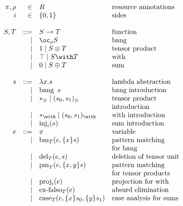 \documentclass[sigplan,review]{acmart}\settopmatter{printfolios=true,printccs=false,printacmref=false}
\newcommand{\fun}[2]{#1 \multimap #2}
\newcommand{\lam}[2]{\lambda #1. #2}
\newcommand{\excl}[2]{\oc_{#1} #2}
\newcommand{\bang}[1]{\operatorname{bang}\ #1}
\newcommand{\bm}[3]{\operatorname{bm}_{#1}(#2, #3)}
\newcommand{\tensorOne}[0]{1}
\newcommand{\unit}[0]{{*}_\otimes}
\newcommand{\del}[3]{\operatorname{del}_{#1}(#2, #3)}
\newcommand{\tensor}[2]{#1 \otimes #2}
\newcommand{\ten}[2]{(#1, #2)_{\otimes}}
\newcommand{\prm}[3]{\operatorname{pm}_{#1}(#2, #3)}
\newcommand{\withTOne}[0]{\top}
\newcommand{\eat}[0]{{*}_{\with}}
\newcommand{\withT}[2]{#1 \with #2}
\newcommand{\wth}[2]{(#1, #2)_{\with}}
\newcommand{\proj}[2]{\operatorname{proj}_{#1}(#2)}
\newcommand{\sumTZero}[0]{0}
\newcommand{\exf}[2]{\operatorname{ex-falso}_{#1}(#2)}
\newcommand{\sumT}[2]{#1 \oplus #2}
\newcommand{\inj}[2]{\operatorname{inj}_{#1}(#2)}
\newcommand{\cse}[4]{\operatorname{case}_{#1}(#2, #3, #4)}
\newcommand{\bind}[2]{\{#1\}#2}
\begin{document}
\begin{displaymath}
  \begin{array}{rrll}
    \pi,\rho & \in & R & \textrm{resource annotations} \\
    i & \in & \{0,1\} & \textrm{sides} \\
    \\
    S,T &  ::= & \fun{S}{T}                    & \textrm{function} \\
        & \mid & \excl{\rho}{S}                & \textrm{bang} \\
        & \mid & \tensorOne \mid \tensor{S}{T} & \textrm{tensor product} \\
        & \mid & \withTOne \mid \withT{S}{T}   & \textrm{with} \\
        & \mid & \sumTZero \mid \sumT{S}{T}    & \textrm{sum} \\
    \\
    s &  ::= & \lam{x}{s} & \textrm{lambda abstraction} \\
      & \mid & \bang{s} & \textrm{bang introduction} \\
      & \mid & \unit \mid \ten{s_0}{s_1} & \textrm{tensor product} \\
      &      &                           & \textrm{introduction} \\
      & \mid & \eat \mid \wth{s_0}{s_1} & \textrm{with introduction} \\
      & \mid & \inj{i}{s} & \textrm{sum introduction} \\
    e &  ::= & x & \textrm{variable} \\
      & \mid & \bm{T}{e}{\bind{x}{s}}  & \textrm{pattern matching} \\
      &      &                         & \textrm{for bang} \\
      & \mid & \del{T}{e}{s} & \textrm{deletion of tensor unit} \\
      & \mid & \prm{T}{e}{\bind{x,y}{s}} & \textrm{pattern matching} \\
      &      &                           & \textrm{for tensor products} \\
      & \mid & \proj{i}{e} & \textrm{projection for with} \\
      & \mid & \exf{T}{e} & \textrm{absurd elimination} \\
      & \mid & \cse{T}{e}{\bind{x}{s_0}}{\bind{y}{s_1}}
                       & \textrm{case analysis for sums}
  \end{array}
\end{displaymath}
\end{document}
